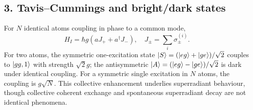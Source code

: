 \subsection*{3. Tavis--Cummings and bright/dark states}
For \(N\) identical atoms coupling in phase to a common mode,
\[
H_I=\hbar g(aJ_++a^\dagger J_-),\quad
J_\pm=\sum_i\sigma_\pm^{(i)}.
\]
For two atoms, the symmetric one-excitation state
\(\left\lvert S\right\rangle=(\left\lvert eg\right\rangle+\left\lvert ge\right\rangle)/\sqrt2\) couples to
\(\left\lvert gg,1\right\rangle\) with strength \(\sqrt2g\);
the antisymmetric \(\left\lvert A\right\rangle=(\left\lvert eg\right\rangle-\left\lvert ge\right\rangle)/\sqrt2\)
is dark under identical coupling. For a symmetric single
excitation in \(N\) atoms, the coupling is \(g\sqrt N\).
This collective enhancement underlies superradiant behaviour,
though collective coherent exchange and spontaneous superradiant
decay are not identical phenomena.

